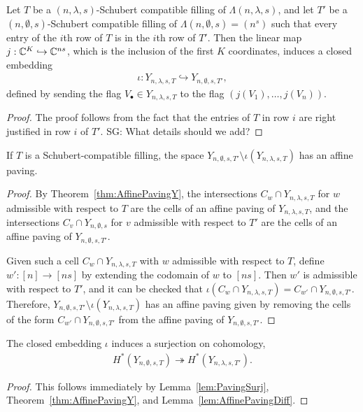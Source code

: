 \documentclass[12pt]{amsart}
\newcommand{\la}{\lambda}
\newcommand{\SG}[1]{{\color{red} SG: #1}}
\begin{document}
\begin{lemma}\label{lem:Embedding}
Let $T$ be a $(n,\la,s)$-Schubert compatible filling of $\Lambda(n,\la,s)$, and let $T'$ be a $(n,\emptyset,s)$-Schubert compatible filling of $\Lambda(n,\emptyset,s) = (n^s)$ such that every entry of the $i$th row of $T$ is in the $i$th row of $T'$. Then the linear map $j : \mathbb{C}^K \hookrightarrow \mathbb{C}^{ns}$, which is the inclusion of the first $K$ coordinates, induces a closed embedding 
\begin{align}
\iota : Y_{n,\la,s,T}\hookrightarrow Y_{n,\emptyset,s,T'},
\end{align}
defined by sending the flag $V_\bullet\in Y_{n,\la,s,T}$ to the flag $(j(V_1),\dots, j(V_n))$.
\end{lemma}

\begin{proof}
The proof follows from the fact that the entries of $T$ in row $i$ are right justified in row $i$ of $T'$. \SG{What details should we add?}
\end{proof}

\begin{lemma}\label{lem:AffinePavingDiff}
If $T$ is a Schubert-compatible filling, the space $Y_{n,\emptyset,s,T'}\setminus \iota(Y_{n,\la,s,T})$ has an affine paving.
\end{lemma}

\begin{proof}
By Theorem~\ref{thm:AffinePavingY}, the intersections $C_w\cap Y_{n,\la,s,T}$ for $w$ admissible with respect to $T$ are the cells of an affine paving of $Y_{n,\la,s,T}$, and the intersections $C_v\cap Y_{n,\emptyset,s}$ for $v$ admissible with respect to $T'$ are the cells of an affine paving of $Y_{n,\emptyset,s,T'}$.

Given such a cell $C_w\cap Y_{n,\la,s,T}$ with $w$ admissible with respect to $T$, define $w' : [n]\to [ns]$ by extending the codomain of $w$ to $[ns]$. Then $w'$ is admissible with respect to $T'$, and it can be checked that $\iota(C_w\cap Y_{n,\la,s,T}) = C_{w'}\cap Y_{n,\emptyset,s,T'}$. Therefore, $Y_{n,\emptyset,s,T'}\setminus \iota(Y_{n,\la,s,T})$ has an affine paving given by removing the cells of the form $C_{w'}\cap Y_{n,\emptyset,s,T'}$ from the affine paving of $Y_{n,\emptyset,s,T'}$.
\end{proof}





\begin{corollary}\label{cor:Surj}
The closed embedding $\iota$ induces a surjection on cohomology,
\begin{align}
H^*(Y_{n,\emptyset,s,T}) \twoheadrightarrow H^*(Y_{n,\la,s,T'}).
\end{align}
\end{corollary}
\begin{proof}
This follows immediately by Lemma~\ref{lem:PavingSurj}, Theorem~\ref{thm:AffinePavingY}, and Lemma~\ref{lem:AffinePavingDiff}.
\end{proof}
\end{document}
